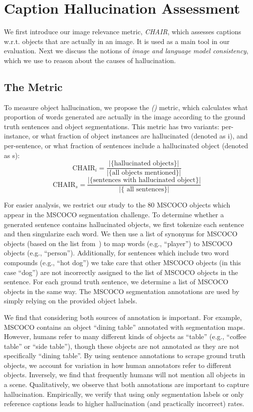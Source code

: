 \section{Caption Hallucination Assessment}

We first introduce our image relevance metric, \emph{CHAIR}, which assesses captions w.r.t. objects that are actually in an image. It is used as a main tool in our evaluation. Next we discuss the notions of \emph{image and language model consistency}, which we use to reason about the causes of hallucination. %

\subsection{The \metric{} Metric}
\label{sec:metric}
%
To measure object hallucination, we propose the \emph{\metric{} (\metricfullname{})} metric, which calculates what proportion of words generated are actually in the image according to the ground truth sentences and object segmentations. This metric has two variants: per-instance, or what fraction of object instances are hallucinated (denoted as \metric{}i), and per-sentence, or what fraction of sentences include a hallucinated object (denoted as \metric{}s):%
$$\text{CHAIR}_{i} = \frac{ \vert\{ \text{hallucinated objects}\}\vert }{\vert\{\text{all objects mentioned}\}\vert }$$
$$\text{CHAIR}_{s} = \frac{ \vert\{ \text{sentences with hallucinated object}\}\vert }{\vert\{\text{  all sentences}\}\vert }$$

%
For easier analysis, we restrict our study to the 80 MSCOCO objects which appear in the MSCOCO segmentation challenge.
To determine whether a generated sentence contains hallucinated objects, we first tokenize each sentence and then singularize each word. 
We then use a list of synonyms for MSCOCO objects (based on the list from~\citet{lu2018neural}) to map words (e.g., ``player'') to MSCOCO objects (e.g., ``person''). 
Additionally, for sentences which include two word compounds (e.g., ``hot dog'') we take care that other MSCOCO objects (in this case ``dog'') are not incorrectly assigned to the list of MSCOCO objects in the sentence.
%
%
For each ground truth sentence, we determine a list of MSCOCO objects in the same way.
The MSCOCO segmentation annotations are used by simply relying on the provided object labels.

We find that considering both sources of annotation is important.
For example, MSCOCO contains an object ``dining table'' annotated with segmentation maps. However, humans refer to many different kinds of objects as ``table'' (e.g., ``coffee table'' or ``side table''), though these objects are not annotated as they are not specifically ``dining table''.
By using sentence annotations to scrape ground truth objects, we account for variation in how human annotators refer to different objects.
%
Inversely, we find that frequently humans will not mention all objects in a scene. 
Qualitatively, we observe that both annotations are important to capture hallucination.
Empirically, we verify that using only segmentation labels or only reference captions leads to higher hallucination (and practically incorrect) rates.
%


